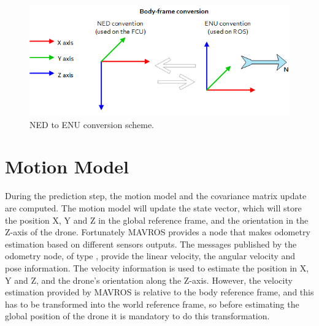 \begin{figure}
    \centering
    \includegraphics[width=\textwidth]{Images/fig6-ned2enu.png}
    \caption[NED to ENU conversion scheme]{\ac{NED} to \ac{ENU} conversion scheme. \cite{mavros}}
    \label{fig:chapter2:drone:frames:enu2ned}
\end{figure}

\section{Motion Model}
\label{sec:chapter2:prediction}
During the prediction step, the motion model and the covariance matrix update are computed. The motion model will update the state vector, which will store the position X, Y and Z in the global reference frame, and the orientation in the Z-axis of the drone. Fortunately MAVROS provides a node that makes odometry estimation based on different sensors outputs. The messages published by the odometry node, of type , provide the linear velocity, the angular velocity and pose information. The velocity information is used to estimate the position in X, Y and Z, and the drone's orientation along the Z-axis. However, the velocity estimation provided by MAVROS is relative to the body reference frame, and this has to be transformed into the world reference frame, so before estimating the global position of the drone it is mandatory to do this transformation.

